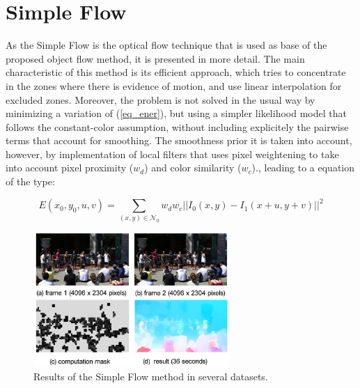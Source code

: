 \section{Simple Flow}

As the Simple Flow \cite{c21} is the optical flow technique that is used as base of the proposed 
object flow method, it is presented in more detail. 
The main characteristic of this method is its efficient approach, which tries to concentrate in the zones where there is evidence of motion, and use linear 
interpolation for excluded zones. 
Moreover, the problem is not solved in the usual way by minimizing a variation of (\ref{eq_ener}), but using a simpler likelihood model that 
follows the constant-color assumption, without including explicitely the pairwise terms that account for smoothing. The smoothness prior it is taken into 
account, however, by implementation of local filters that uses pixel weightening to take into account pixel proximity ($w_d$) and color similarity ($w_c$)., leading to a equation 
of the type: 

\begin{equation}
E(x_0, y_0, u, v) = \sum_{(x,y) \in \mathcal{N}_{0}} w_{d}w_{c}||  I_{0}(x,y) - I_{1}(x+u,y+v) ||^2
\label{eq_simple}
\end{equation}

   \begin{figure}[bhp]
      \centering
      \includegraphics[width=0.66\textwidth]{../images/simpleflow.png}
      \caption{  Results of the Simple Flow method in several datasets. }
      \label{simple_of}
   \end{figure}

